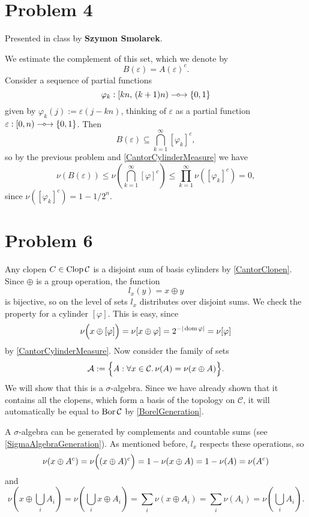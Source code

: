 \section*{Problem 4}

Presented in class by \textbf{Szymon Smolarek}.

We estimate the complement of this set, which we denote by
\[ 
B(\varepsilon ) = A (\varepsilon )^c.
\]
Consider a sequence of partial functions
\[ 
    \varphi_k: [kn,\, (k+1)n) \multimap\mspace{-2mu}\to \left\{ 0,1 \right\}
\]
given by \( \varphi_k( j ) := \varepsilon(j - kn) \), thinking of \(\varepsilon \) as a partial function \(\varepsilon: [0,n) \multimap\mspace{-2mu}\to \left\{ 0,1 \right\} \). Then
\[ 
    B(\varepsilon ) \subseteq \bigcap_{k=1}^\infty \left[ \varphi_k \right]^c,
\]
so by the previous problem and \ref{CantorCylinderMeasure} we have
\[ 
    \nu(B(\varepsilon )) \leqslant \nu \left( \bigcap_{k=1}^\infty \left[ \varphi \right]^c \right) \leqslant \prod_{k=1}^\infty \nu \left( \left[ \varphi_k \right]^c \right) = 0,
\]
since \( \nu \left( \left[ \varphi_k \right]^c \right) = 1 - 1/2^n \).

\section*{Problem 6}

Any clopen \( C \in \operatorname{Clop} \mathcal{C} \) is a disjoint sum of basis cylinders by \ref{CantorClopen}. Since \( \oplus \) is a group operation, the function 
\[ 
    l_x(y) = x \oplus y 
\]
is bijective, so on the level of sets \( l_x \) distributes over disjoint sums. We check the property for a cylinder \( \left[ \varphi \right] \). This is easy, since
\[ 
    \nu \Bigl( x \oplus \left[ \varphi \right] \Bigr) = \nu[ x \oplus \varphi] = 2^{-|\operatorname{dom} \varphi|} = \nu [\varphi]
\]
by \ref{CantorCylinderMeasure}. Now consider the family of sets
\[ 
    \mathcal{A} := \Bigl\{ A : \forall x \in \mathcal{C}. \,\nu(A) = \nu(x \oplus A) \Bigr\}.
\]
We will show that this is a \( \sigma \)-algebra. Since we have already shown that it contains all the clopens, which form a basis of the topology on \( \mathcal{C} \), it will automatically be equal to \( \operatorname{Bor} \mathcal{C} \) by \ref{BorelGeneration}.

A \( \sigma \)-algebra can be generated by complements and countable sums (see \ref{SigmaAlgebraGeneration}). As mentioned before, \( l_x \) respects these operations, so
\[ 
    \nu(x\oplus A^c) = \nu \Bigl( (x \oplus A)^c \Bigr) = 1 - \nu(x \oplus A) = 1 - \nu(A) = \nu(A^c) 
\]
and
\[ 
    \nu \left( x \oplus \bigcup_i A_i \right) = \nu \left( \bigcup_i x \oplus A_i \right) = \sum_i \nu(x \oplus A_i) = \sum_i \nu(A_i) = \nu \left( \bigcup_i A_i \right).
\]

